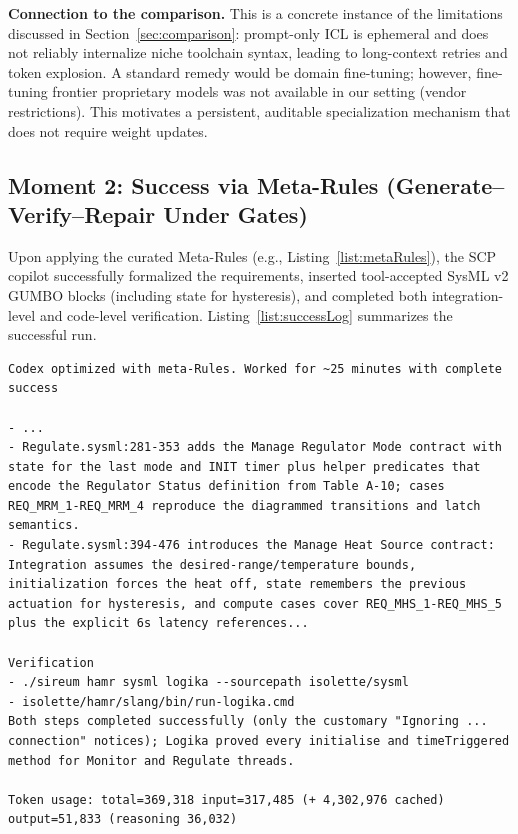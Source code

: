 \documentclass[conference]{IEEEtran}
\begin{document}
\textbf{Connection to the comparison.} This is a concrete instance of the limitations discussed in Section~\ref{sec:comparison}: prompt-only ICL is ephemeral and does not reliably internalize niche toolchain syntax, leading to long-context retries and token explosion. A standard remedy would be domain fine-tuning; however, fine-tuning frontier proprietary models was not available in our setting (vendor restrictions). This motivates a persistent, auditable specialization mechanism that does not require weight updates.

\subsection{Moment 2: Success via Meta-Rules (Generate--Verify--Repair Under Gates)}
Upon applying the curated Meta-Rules (e.g., Listing~\ref{list:metaRules}), the SCP copilot successfully formalized the requirements, inserted tool-accepted SysML v2 GUMBO blocks (including state for hysteresis), and completed both integration-level and code-level verification. Listing~\ref{list:successLog} summarizes the successful run.

\begin{lstlisting}[caption={Success Log: Transcript showing successful formalization and verification after applying Meta-Rules.}, label={list:successLog}, float=t]
Codex optimized with meta-Rules. Worked for ~25 minutes with complete success

- ...
- Regulate.sysml:281-353 adds the Manage Regulator Mode contract with state for the last mode and INIT timer plus helper predicates that encode the Regulator Status definition from Table A-10; cases REQ_MRM_1-REQ_MRM_4 reproduce the diagrammed transitions and latch semantics.
- Regulate.sysml:394-476 introduces the Manage Heat Source contract: Integration assumes the desired-range/temperature bounds, initialization forces the heat off, state remembers the previous actuation for hysteresis, and compute cases cover REQ_MHS_1-REQ_MHS_5 plus the explicit 6s latency references...

Verification
- ./sireum hamr sysml logika --sourcepath isolette/sysml
- isolette/hamr/slang/bin/run-logika.cmd
Both steps completed successfully (only the customary "Ignoring ... connection" notices); Logika proved every initialise and timeTriggered method for Monitor and Regulate threads.

Token usage: total=369,318 input=317,485 (+ 4,302,976 cached) output=51,833 (reasoning 36,032)
\end{lstlisting}
\end{document}
